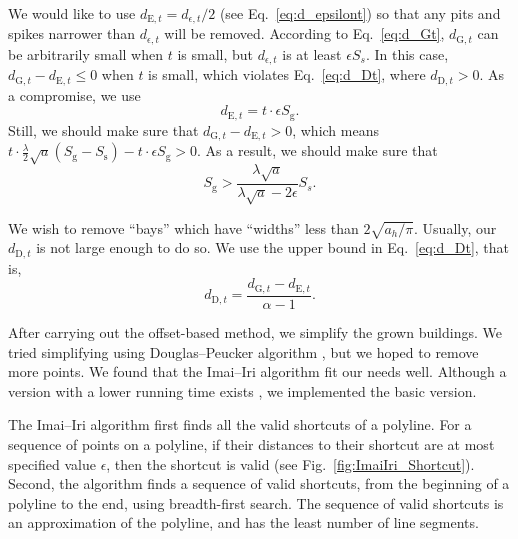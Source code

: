 \documentclass[graybox]{svmult}
\newcommand{\fig}{Fig.~}
\newcommand{\eq}{Eq.~}
\newcommand{\dtrm}[1]{d_{\mathrm{#1},t}}
\begin{document}
We would like to use $\dtrm{E}=d_{\epsilon, t}/2$
(see \eq\ref{eq:d_epsilont}) so that
any pits and spikes narrower than $d_{\epsilon, t}$ will be removed.
According to \eq\ref{eq:d_Gt}, $\dtrm{G}$ can be arbitrarily small 
when $t$ is small, 
but $d_{\epsilon, t}$ is at least $\epsilon S_s$. 
In this case, $\dtrm{G}-\dtrm{E} \le 0$ when $t$ is small, 
which violates \eq\ref{eq:d_Dt}, where $\dtrm{D}>0$.
As a compromise, we use
\[
\dtrm{E} =t \cdot \epsilon S_\mathrm{g}.
\]
Still, we should make sure that $\dtrm{G}-\dtrm{E} > 0$, which means
$t \cdot \frac{\lambda}{2}\sqrt{a} (S_\mathrm{g}-S_\mathrm{s})-
t \cdot \epsilon S_\mathrm{g} >0$.
As a result, we should make sure that
\begin{equation}
\label{eq:S_g}
S_\mathrm{g} > \frac{\lambda\sqrt{a}}{\lambda\sqrt{a}-2\epsilon} S_s.
\end{equation}

We wish to remove ``bays'' which have ``widths'' less than $2\sqrt{a_h/\pi}$.
Usually, our $\dtrm{D}$ is not large enough to do so.
We use the upper bound in \eq\ref{eq:d_Dt}, that is,
\[
\dtrm{D} = \frac{\dtrm{G}-\dtrm{E}}{\alpha - 1}.
\]

After carrying out the offset-based method, we simplify the grown buildings. 
We tried simplifying using Douglas--Peucker algorithm \parencite{Douglas1973}, 
but we hoped to remove more points. We found that the Imai--Iri 
algorithm \parencite{ImaiIri1988} fit our needs well. Although a version with a 
lower running time exists \parencite[see][]{Chan1992}, we implemented the basic 
version.

The Imai--Iri algorithm first finds all the valid shortcuts of a polyline.
For a sequence of points on a polyline, 
if their distances to their shortcut are 
at most specified value $\epsilon$, then the shortcut is valid (see 
\fig\ref{fig:ImaiIri_Shortcut}). 
Second, the algorithm finds a sequence of valid shortcuts, from the beginning 
of a polyline to the end, using breadth-first search.
The sequence of valid shortcuts is an approximation of the polyline, 
and has the least number of line segments.
\end{document}
